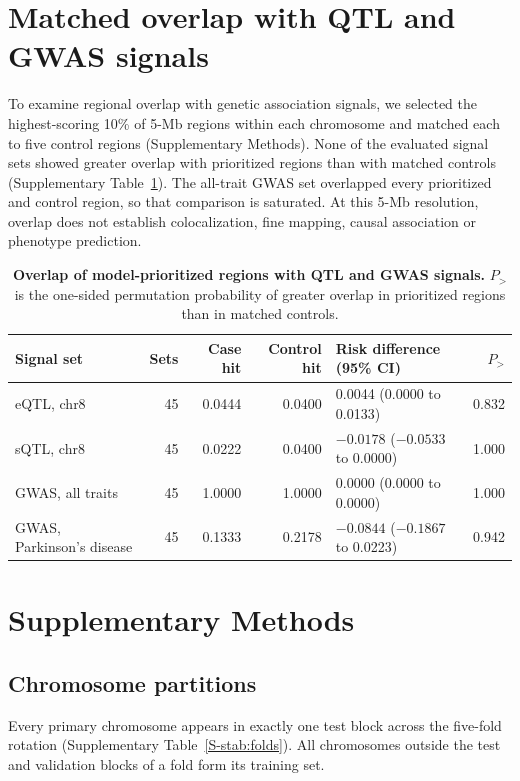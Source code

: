\documentclass[11pt]{article}
\begin{document}
\begin{bibunit}[unsrtnat]
\section{Matched overlap with QTL and GWAS signals}
\label{S-snote:overlap}

To examine regional overlap with genetic association signals, we selected the highest-scoring 10\% of 5-Mb regions within each chromosome and matched each to five control regions (Supplementary Methods). None of the evaluated signal sets showed greater overlap with prioritized regions than with matched controls (Supplementary Table~\ref{S-stab:overlap}). The all-trait GWAS set overlapped every prioritized and control region, so that comparison is saturated. At this 5-Mb resolution, overlap does not establish colocalization, fine mapping, causal association or phenotype prediction.

\begin{table}[H]
\centering
\caption{\textbf{Overlap of model-prioritized regions with QTL and GWAS signals.} $P_{>}$ is the one-sided permutation probability of greater overlap in prioritized regions than in matched controls.}
\label{S-stab:overlap}
\small
\begin{tabular}{@{}lrrrlr@{}}
\toprule
Signal set & Sets & Case hit & Control hit & Risk difference (95\% CI) & $P_{>}$ \\
\midrule
eQTL, chr8 & 45 & 0.0444 & 0.0400 & 0.0044 (0.0000 to 0.0133) & 0.832 \\
sQTL, chr8 & 45 & 0.0222 & 0.0400 & $-0.0178$ ($-0.0533$ to 0.0000) & 1.000 \\
GWAS, all traits & 45 & 1.0000 & 1.0000 & 0.0000 (0.0000 to 0.0000) & 1.000 \\
GWAS, Parkinson's disease & 45 & 0.1333 & 0.2178 & $-0.0844$ ($-0.1867$ to 0.0223) & 0.942 \\
\bottomrule
\end{tabular}
\end{table}

\section*{Supplementary Methods}

\subsection{Chromosome partitions}
Every primary chromosome appears in exactly one test block across the five-fold rotation (Supplementary Table~\ref{S-stab:folds}). All chromosomes outside the test and validation blocks of a fold form its training set.


\end{bibunit}
\end{document}
